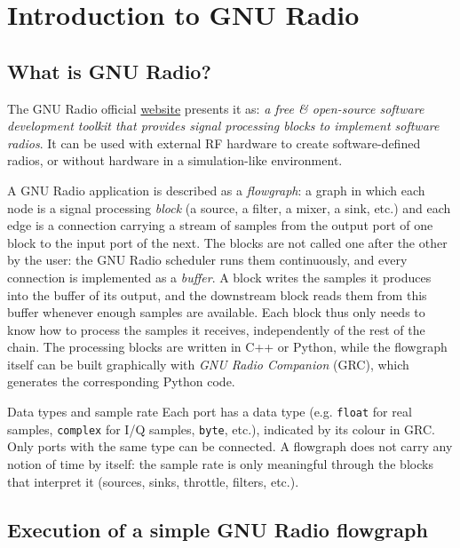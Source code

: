 \section{Introduction to GNU Radio}

\subsection{What is GNU Radio?}

The GNU Radio official \href{https://wiki.gnuradio.org/index.php?title=What_Is_GNU_Radio}{website} presents it as: \emph{a free \& open-source software development toolkit that provides signal processing blocks to implement software radios}. It can be used with external RF hardware to create software-defined radios, or without hardware in a simulation-like environment.

A GNU Radio application is described as a \emph{flowgraph}: a graph in which each node is a signal processing \emph{block} (a source, a filter, a mixer, a sink, etc.) and each edge is a connection carrying a stream of samples from the output port of one block to the input port of the next. The blocks are not called one after the other by the user: the GNU Radio scheduler runs them continuously, and every connection is implemented as a \emph{buffer}. A block writes the samples it produces into the buffer of its output, and the downstream block reads them from this buffer whenever enough samples are available. Each block thus only needs to know how to process the samples it receives, independently of the rest of the chain. The processing blocks are written in C++ or Python, while the flowgraph itself can be built graphically with \emph{GNU Radio Companion} (GRC), which generates the corresponding Python code.

\begin{bclogo}[couleur = gray!20, arrondi = 0.2, logo=\bcinfo]{Data types and sample rate}
Each port has a data type (e.g. \texttt{float} for real samples, \texttt{complex} for I/Q samples, \texttt{byte}, etc.), indicated by its colour in GRC. Only ports with the same type can be connected. A flowgraph does not carry any notion of time by itself: the sample rate is only meaningful through the blocks that interpret it (sources, sinks, throttle, filters, etc.).
\end{bclogo}

\subsection{Execution of a simple GNU Radio flowgraph}

